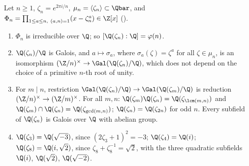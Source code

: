 \begin{theorem}\label{thm:galois:cyclotomic}
Let $n\ge1$, $\zeta_n=e^{2\pi i/n}$, $\mu_n=\langle\zeta_n\rangle\subset\Qbar$, and $\Phi_n=\prod_{1\le a\le n,\ (a,n)=1}(x-\zeta_n^a)\in\Z[x]$ ().
\begin{enumerate}[label=(\alph*)]
\item $\Phi_n$ is irreducible over $\Q$; so $[\Q(\zeta_n):\Q]=\varphi(n)$.
\item $\Q(\zeta_n)/\Q$ is Galois, and $a\mapsto\sigma_a$, where $\sigma_a(\zeta)=\zeta^a$ for all $\zeta\in\mu_n$, is an isomorphism
$(\Z/n)^\times\to\Gal(\Q(\zeta_n)/\Q)$, which does not depend on the choice of a primitive $n$-th root of unity.
\item For $m\mid n$, restriction $\Gal(\Q(\zeta_n)/\Q)\to\Gal(\Q(\zeta_m)/\Q)$ is reduction $(\Z/n)^\times\to(\Z/m)^\times$. For all $m,n$:
$\Q(\zeta_m)\Q(\zeta_n)=\Q(\zeta_{\lcm(m,n)})$ and $\Q(\zeta_m)\cap\Q(\zeta_n)=\Q(\zeta_{\gcd(m,n)})$; $\Q(\zeta_n)=\Q(\zeta_{2n})$ for odd $n$. Every subfield of
$\Q(\zeta_n)$ is Galois over $\Q$ with abelian group.
\item $\Q(\zeta_3)=\Q(\sqrt{-3})$, since $(2\zeta_3+1)^2=-3$; $\Q(\zeta_4)=\Q(i)$; $\Q(\zeta_8)=\Q(i,\sqrt2)$, since $\zeta_8+\zeta_8^{-1}=\sqrt2$, with the three
quadratic subfields $\Q(i)$, $\Q(\sqrt2)$, $\Q(\sqrt{-2})$.
\end{enumerate}
\end{theorem}

